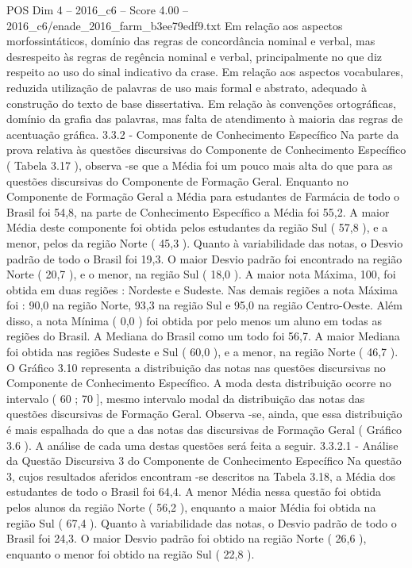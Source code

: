 \begin{textsample}{POS Dim 4 – 2016\_c6 – Score 4.00 – 2016\_c6/enade\_2016\_farm\_b3ee79edf9.txt}
Em relação aos aspectos morfossintáticos, domínio das regras de concordância nominal e verbal, mas desrespeito às regras de regência nominal e verbal, principalmente no que diz respeito ao uso do sinal indicativo da crase.
Em relação aos aspectos vocabulares, reduzida utilização de palavras de uso mais formal e abstrato, adequado à construção do texto de base dissertativa.
Em relação às convenções ortográficas, domínio da grafia das palavras, mas falta de atendimento à maioria das regras de acentuação gráfica. 3.3.2 - Componente de Conhecimento Específico Na parte da prova relativa às questões discursivas do Componente de Conhecimento Específico ( Tabela 3.17 ), observa -se que a Média foi um pouco mais alta do que para as questões discursivas do Componente de Formação Geral.
Enquanto no Componente de Formação Geral a Média para estudantes de Farmácia de todo o Brasil foi 54,8, na parte de Conhecimento Específico a Média foi 55,2.
A maior Média deste componente foi obtida pelos estudantes da região Sul ( 57,8 ), e a menor, pelos da região Norte ( 45,3 ).
Quanto à variabilidade das notas, o Desvio padrão de todo o Brasil foi 19,3.
O maior Desvio padrão foi encontrado na região Norte ( 20,7 ), e o menor, na região Sul ( 18,0 ).
A maior nota Máxima, 100, foi obtida em duas regiões : Nordeste e Sudeste.
Nas demais regiões a nota Máxima foi : 90,0 na região Norte, 93,3 na região Sul e 95,0 na região Centro-Oeste.
Além disso, a nota Mínima ( 0,0 ) foi obtida por pelo menos um aluno em todas as regiões do Brasil.
A Mediana do Brasil como um todo foi 56,7.
A maior Mediana foi obtida nas regiões Sudeste e Sul ( 60,0 ), e a menor, na região Norte ( 46,7 ).
O Gráfico 3.10 representa a distribuição das notas nas questões discursivas no Componente de Conhecimento Específico.
A moda desta distribuição ocorre no intervalo ( 60 ; 70 ], mesmo intervalo modal da distribuição das notas das questões discursivas de Formação Geral.
Observa -se, ainda, que essa distribuição é mais espalhada do que a das notas das discursivas de Formação Geral ( Gráfico 3.6 ).
A análise de cada uma destas questões será feita a seguir. 3.3.2.1 - Análise da Questão Discursiva 3 do Componente de Conhecimento Específico Na questão 3, cujos resultados aferidos encontram -se descritos na Tabela 3.18, a Média dos estudantes de todo o Brasil foi 64,4.
A menor Média nessa questão foi obtida pelos alunos da região Norte ( 56,2 ), enquanto a maior Média foi obtida na região Sul ( 67,4 ).
Quanto à variabilidade das notas, o Desvio padrão de todo o Brasil foi 24,3.
O maior Desvio padrão foi obtido na região Norte ( 26,6 ), enquanto o menor foi obtido na região Sul ( 22,8 ).

\end{textsample}
